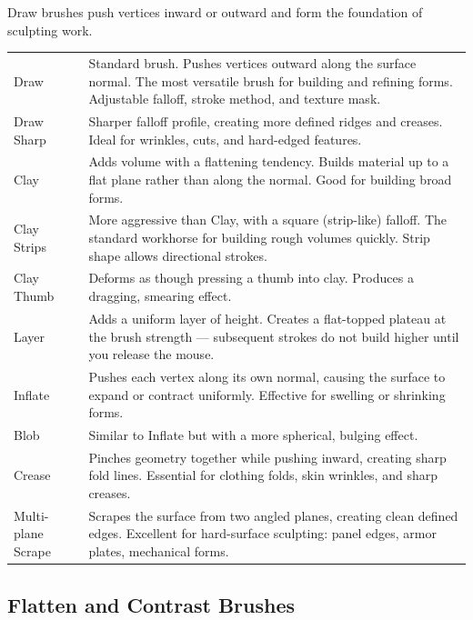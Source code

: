 Draw brushes push vertices inward or outward and form the foundation of sculpting work.

\begin{center}
\begin{tabularx}{\textwidth}{L{3.5cm}X}
\toprule
{}
 &  \\
\midrule
Draw & Standard brush. Pushes vertices outward along the surface normal. The most versatile brush for building and refining forms. Adjustable falloff, stroke method, and texture mask. \\
Draw Sharp & Sharper falloff profile, creating more defined ridges and creases. Ideal for wrinkles, cuts, and hard-edged features. \\
Clay & Adds volume with a flattening tendency. Builds material up to a flat plane rather than along the normal. Good for building broad forms. \\
Clay Strips & More aggressive than Clay, with a square (strip-like) falloff. The standard workhorse for building rough volumes quickly. Strip shape allows directional strokes. \\
Clay Thumb & Deforms as though pressing a thumb into clay. Produces a dragging, smearing effect. \\
Layer & Adds a uniform layer of height. Creates a flat-topped plateau at the brush strength --- subsequent strokes do not build higher until you release the mouse. \\
Inflate & Pushes each vertex along its own normal, causing the surface to expand or contract uniformly. Effective for swelling or shrinking forms. \\
Blob & Similar to Inflate but with a more spherical, bulging effect. \\
Crease & Pinches geometry together while pushing inward, creating sharp fold lines. Essential for clothing folds, skin wrinkles, and sharp creases. \\
Multi-plane Scrape & Scrapes the surface from two angled planes, creating clean defined edges. Excellent for hard-surface sculpting: panel edges, armor plates, mechanical forms. \\
\bottomrule
\end{tabularx}
\end{center}

\subsection{Flatten and Contrast Brushes}
\label{sec:flattenbrushes}

